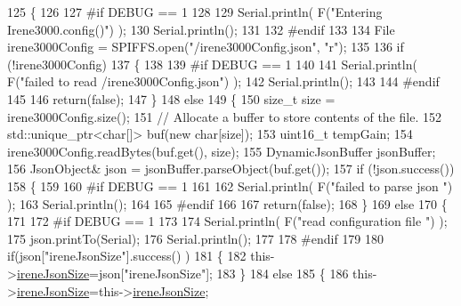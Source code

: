 \begin{DoxyCode}
125 \{
126 
127 \textcolor{preprocessor}{#if DEBUG == 1 }
128 
129     Serial.println( F(\textcolor{stringliteral}{"Entering Irene3000.config()"}) );
130     Serial.println();
131 
132 \textcolor{preprocessor}{#endif}
133 
134     File irene3000Config = SPIFFS.open(\textcolor{stringliteral}{"/irene3000Config.json"}, \textcolor{stringliteral}{"r"});
135 
136     \textcolor{keywordflow}{if} (!irene3000Config) 
137     \{
138     
139 \textcolor{preprocessor}{    #if DEBUG == 1 }
140 
141         Serial.println( F(\textcolor{stringliteral}{"failed to read /irene3000Config.json"}) );
142         Serial.println();
143     
144 \textcolor{preprocessor}{    #endif}
145 
146         \textcolor{keywordflow}{return}(\textcolor{keyword}{false});
147     \}
148     \textcolor{keywordflow}{else}
149     \{
150         \textcolor{keywordtype}{size\_t} size = irene3000Config.size();
151         \textcolor{comment}{// Allocate a buffer to store contents of the file.}
152         std::unique\_ptr<char[]> buf(\textcolor{keyword}{new} \textcolor{keywordtype}{char}[size]);
153             uint16\_t tempGain;
154         irene3000Config.readBytes(buf.get(), size);
155         DynamicJsonBuffer jsonBuffer;
156         JsonObject& json = jsonBuffer.parseObject(buf.get());
157         \textcolor{keywordflow}{if} (!json.success()) 
158         \{
159         
160 \textcolor{preprocessor}{        #if DEBUG == 1 }
161 
162             Serial.println( F(\textcolor{stringliteral}{"failed to parse json "}) );
163             Serial.println();
164         
165 \textcolor{preprocessor}{        #endif}
166             
167             \textcolor{keywordflow}{return}(\textcolor{keyword}{false});
168         \} 
169         \textcolor{keywordflow}{else}
170         \{
171         
172 \textcolor{preprocessor}{        #if DEBUG == 1 }
173     
174             Serial.println( F(\textcolor{stringliteral}{"read configuration file "}) );
175             json.printTo(Serial);
176             Serial.println();
177         
178 \textcolor{preprocessor}{        #endif }
179             
180             \textcolor{keywordflow}{if}(json[\textcolor{stringliteral}{"ireneJsonSize"}].success() )
181             \{
182                 this->\hyperlink{classIrene3000_a6534710e4c81669dcc828d2c5450fabe}{ireneJsonSize}=json[\textcolor{stringliteral}{"ireneJsonSize"}];
183             \}
184             \textcolor{keywordflow}{else}
185             \{
186                 this->\hyperlink{classIrene3000_a6534710e4c81669dcc828d2c5450fabe}{ireneJsonSize}=this->\hyperlink{classIrene3000_a6534710e4c81669dcc828d2c5450fabe}{ireneJsonSize};

\end{DoxyCode}
